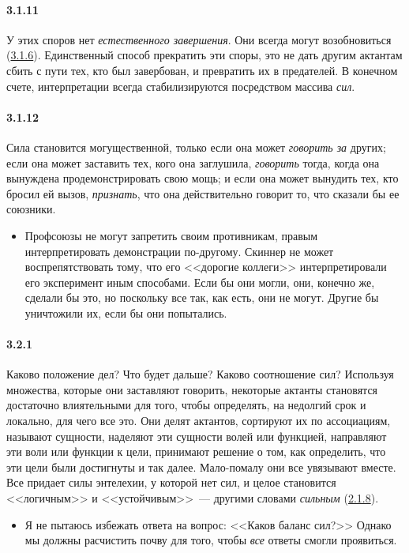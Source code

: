 \paragraph{3.1.11}\hypertarget{par:3.1.11}{} У этих споров нет {\itshape естественного завершения}. Они всегда могут возобновиться (\hyperlink{par:3.1.6}{3.1.6}). Единственный способ прекратить эти споры, это не дать другим актантам сбить с пути тех, кто был завербован, и превратить их в предателей. В конечном счете, интерпретации всегда стабилизируются посредством массива {\itshape сил}.

\paragraph{3.1.12}\hypertarget{par:3.1.12}{} Сила становится могущественной, только если она может {\itshape говорить за} других; если она может заставить тех, кого она заглушила, {\itshape говорить} тогда, когда она вынуждена продемонстрировать свою мощь; и если она может вынудить тех, кто бросил ей вызов, {\itshape признать}, что она действительно говорит то, что сказали бы ее союзники. 
	\begin{itemize}
	\item 
	Профсоюзы не могут запретить своим противникам, правым интерпретировать демонстрации по-другому. Скиннер не может воспрепятствовать тому, что его <<дорогие коллеги>> интерпретировали его эксперимент иным способами. Если бы они могли, они, конечно же, сделали бы это, но поскольку все так, как есть, они не могут. Другие бы уничтожили их, если бы они попытались.
	\end{itemize}

\paragraph{3.2.1}\hypertarget{par:3.2.1}{} Каково положение дел? Что будет дальше? Каково соотношение сил? Используя множества, которые они заставляют говорить, некоторые актанты становятся достаточно влиятельными для того, чтобы определять, на недолгий срок и локально, для чего все это. Они делят актантов, сортируют их по ассоциациям, называют сущности, наделяют эти сущности волей или функцией, направляют эти воли или функции к цели, принимают решение о том, как определить, что эти цели были достигнуты и так далее. Мало-помалу они все увязывают вместе. Все придает силы энтелехии, у которой нет сил, и целое становится <<логичным>> и <<устойчивым>>~--- другими словами {\itshape сильным} (\hyperlink{par:2.1.8}{2.1.8}).
	\begin{itemize}
	\item 
	Я не пытаюсь избежать ответа на вопрос: <<Каков баланс сил?>> Однако мы должны расчистить почву для того, чтобы {\itshape все} ответы смогли проявиться.
	\end{itemize}

